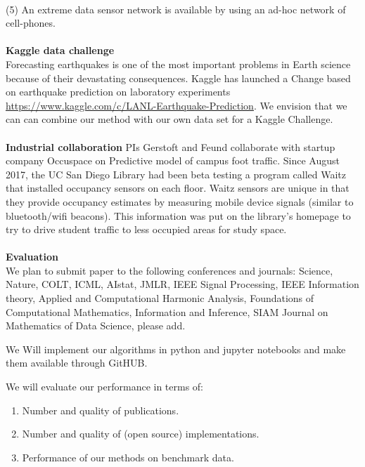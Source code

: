 \documentclass{article}
\begin{document}
\\
(5) An extreme data sensor network is available by using an ad-hoc network of cell-phones.
\\
\\
{\bf Kaggle data challenge}\\
Forecasting earthquakes is one of the most important problems in Earth science because of their devastating consequences. Kaggle has launched a Change based on earthquake prediction on laboratory experiments \href{https://www.kaggle.com/c/LANL-Earthquake-Prediction}{https://www.kaggle.com/c/LANL-Earthquake-Prediction}. We envision that we can can combine our method with our own data set for a Kaggle Challenge.  
\\
\\
{\bf Industrial collaboration}
PIs Gerstoft and Feund collaborate with startup company  Occuspace on
Predictive model of campus foot traffic. Since August 2017, the UC San Diego Library had been beta testing a program called Waitz that installed occupancy sensors on each floor. Waitz sensors are unique in that they provide occupancy estimates by measuring mobile device signals (similar to bluetooth/wifi beacons). This information was put on the library’s homepage to try to drive student traffic to less occupied areas for study space. 
\\
\\
{\bf Evaluation}\\
We plan to submit paper to the following conferences and journals:
Science, Nature, COLT, ICML, AIstat, JMLR, IEEE Signal Processing, IEEE Information
theory, Applied and Computational Harmonic Analysis, Foundations of Computational Mathematics, Information and Inference, SIAM Journal on Mathematics of Data Science, please add.

We Will implement our algorithms in python and jupyter notebooks and
make them available through GitHUB.


We will evaluate our performance in terms of:
\begin{enumerate}
\item Number and quality of publications.
\item Number  and quality of (open source) implementations.
\item Performance of our methods on benchmark data.
\end{enumerate}
\end{document}
